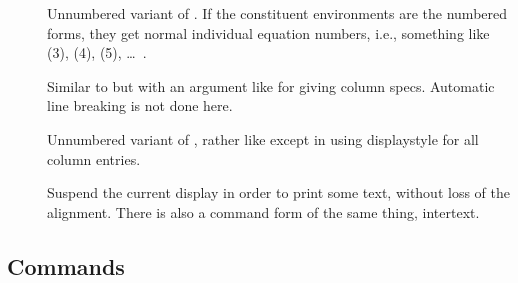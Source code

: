 \documentclass{article}
\newcommand{\ntt}{\normalfont\ttfamily}
\DeclareRobustCommand{\cs}[1]{{\ntt\ttbackslash#1}}
\let\cn=\cs
\begin{document}
\begin{description}
\item[] Unnumbered variant of . If the
constituent environments are the numbered forms, they get normal
individual equation numbers, i.e., something like (3), (4), (5), \dots~.

\item[] Similar to  but with an argument like
 for giving column specs. Automatic line breaking is not
done here.

\item[] Unnumbered variant of , rather like
 except in using \cn{displaystyle} for all column
entries.

\item[] Suspend the current display in order to print some
  text, without loss of the alignment. There is also a command form of
  the same thing, \cn{intertext}.
\end{description}

\subsection{Commands}
\end{document}

